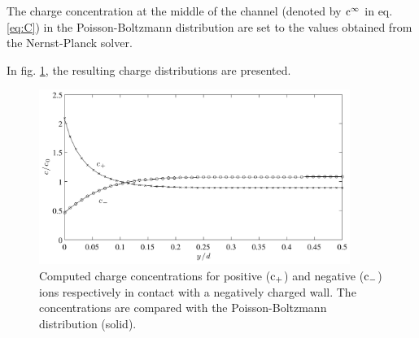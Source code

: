 The charge concentration at the middle of the channel (denoted by
$\mathrm{c}^{\infty}$ in eq. \eqref{eq:C}) in the Poisson-Boltzmann distribution
are set to the values obtained from the Nernst-Planck solver. 

In fig. \ref{fig:mb:np}, the resulting charge distributions are
presented.  

\begin{figure}
\begin{center}
\includegraphics[width=0.9\textwidth]{fig/np_bench.pdf}
\end{center}
\caption[Comparison between the Nernst-Planck and Poisson-Boltzmann
    models.]{Computed charge concentrations for positive ($\mathrm{c}_+$) and
    negative ($\mathrm{c}_{-}$) ions respectively in contact with a negatively
    charged wall. The concentrations are compared with the
    Poisson-Boltzmann distribution (solid).}
\label{fig:mb:np}
\end{figure}


